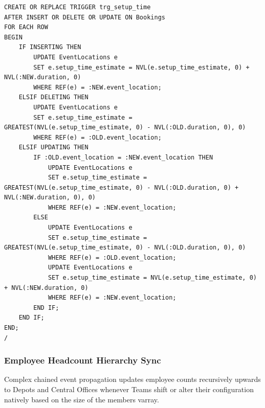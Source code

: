 \begin{verbatim}
CREATE OR REPLACE TRIGGER trg_setup_time
AFTER INSERT OR DELETE OR UPDATE ON Bookings
FOR EACH ROW
BEGIN
    IF INSERTING THEN
        UPDATE EventLocations e 
        SET e.setup_time_estimate = NVL(e.setup_time_estimate, 0) + NVL(:NEW.duration, 0)
        WHERE REF(e) = :NEW.event_location;
    ELSIF DELETING THEN
        UPDATE EventLocations e 
        SET e.setup_time_estimate = GREATEST(NVL(e.setup_time_estimate, 0) - NVL(:OLD.duration, 0), 0)
        WHERE REF(e) = :OLD.event_location;
    ELSIF UPDATING THEN
        IF :OLD.event_location = :NEW.event_location THEN
            UPDATE EventLocations e 
            SET e.setup_time_estimate = GREATEST(NVL(e.setup_time_estimate, 0) - NVL(:OLD.duration, 0) + NVL(:NEW.duration, 0), 0)
            WHERE REF(e) = :NEW.event_location;
        ELSE
            UPDATE EventLocations e 
            SET e.setup_time_estimate = GREATEST(NVL(e.setup_time_estimate, 0) - NVL(:OLD.duration, 0), 0)
            WHERE REF(e) = :OLD.event_location;
            UPDATE EventLocations e 
            SET e.setup_time_estimate = NVL(e.setup_time_estimate, 0) + NVL(:NEW.duration, 0)
            WHERE REF(e) = :NEW.event_location;
        END IF;
    END IF;
END;
/
\end{verbatim}

\subsubsection{Employee Headcount Hierarchy Sync}
Complex chained event propagation updates employee counts recursively upwards to Depots and Central Offices whenever Teams shift or alter their configuration natively based on the size of the members varray.

